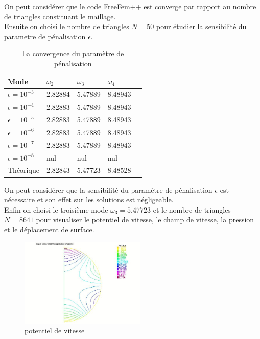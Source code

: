 \documentclass[a4paper]{report}
\begin{document}
On peut considérer que le code FreeFem++ est converge par rapport au nombre de triangles constituant le maillage.
\\[0.25cm]
Ensuite on choisi le nombre de triangles $N = 50$ pour étudier la sensibilité du parametre de pénalisation $\epsilon$.
\begin{table}[htp]
\begin{center}
    \begin{tabular}{ | l | l | l | l | l | }
    \hline
    Mode & $\omega_2$ & $\omega_3$ & $\omega_4$ \\
    \hline
    $\epsilon = 10^{-3}$  & 2.82884 & 5.47889 & 8.48943 \\
    \hline
    $\epsilon = 10^{-4}$  & 2.82883 & 5.47889 & 8.48943 \\
    \hline
    $\epsilon = 10^{-5}$  & 2.82883 & 5.47889 & 8.48943 \\
    \hline
    $\epsilon = 10^{-6}$  & 2.82883 & 5.47889 & 8.48943 \\
    \hline
    $\epsilon = 10^{-7}$  & 2.82883 & 5.47889 & 8.48943 \\
    \hline
    $\epsilon = 10^{-8}$  & nul & nul & nul \\
    \hline
    Théorique   & 2.82843 & 5.47723 & 8.48528 \\
    \hline
    \end{tabular}
\end{center}
\caption{La convergence du paramètre de pénalisation}
\end{table}

On peut considérer que la sensibilité du paramètre de pénalisation $\epsilon$ est nécessaire et son effet sur les solutions est négligeable.
\\[0.25cm]
Enfin on choisi le troisième mode $\omega_3 = 5.47723$ et le nombre de triangles $N = 8641$ pour visualiser le potentiel de vitesse, le champ de vitesse, la pression et le déplacement de surface.



\begin{figure}[h!] 
\begin{center}
\includegraphics[width=6cm]{2_3_1_potentiel_de_vitesse.jpeg}
\caption{potentiel de vitesse}
\end{center}
\end{figure}
\end{document}
